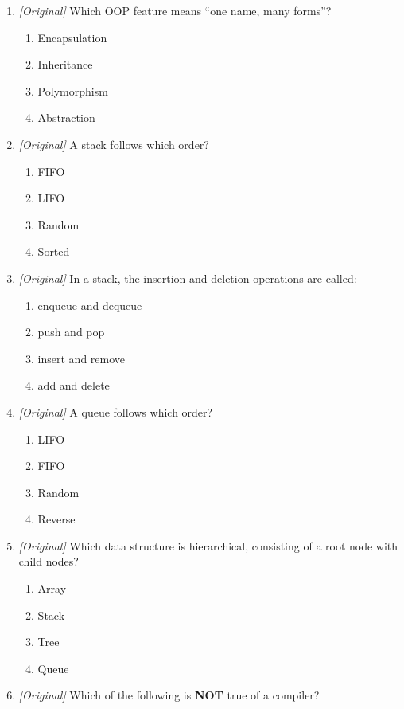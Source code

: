 \documentclass[11pt]{article}
\begin{document}
\begin{enumerate}[label=\textbf{Q\arabic*.}, leftmargin=*]
\item \textit{[Original]} Which OOP feature means ``one name, many forms''?
  \begin{enumerate}[label=\Alph*.]
    \item Encapsulation
    \item Inheritance
    \item Polymorphism
    \item Abstraction
  \end{enumerate}
\item \textit{[Original]} A stack follows which order?
  \begin{enumerate}[label=\Alph*.]
    \item FIFO
    \item LIFO
    \item Random
    \item Sorted
  \end{enumerate}
\item \textit{[Original]} In a stack, the insertion and deletion operations
  are called:
  \begin{enumerate}[label=\Alph*.]
    \item enqueue and dequeue
    \item push and pop
    \item insert and remove
    \item add and delete
  \end{enumerate}
\item \textit{[Original]} A queue follows which order?
  \begin{enumerate}[label=\Alph*.]
    \item LIFO
    \item FIFO
    \item Random
    \item Reverse
  \end{enumerate}
\item \textit{[Original]} Which data structure is hierarchical, consisting of
  a root node with child nodes?
  \begin{enumerate}[label=\Alph*.]
    \item Array
    \item Stack
    \item Tree
    \item Queue
  \end{enumerate}
\item \textit{[Original]} Which of the following is \textbf{NOT} true of a
  compiler?
  \begin{enumerate}[label=\Alph*.]

\end{enumerate}
\end{enumerate}
\end{document}
